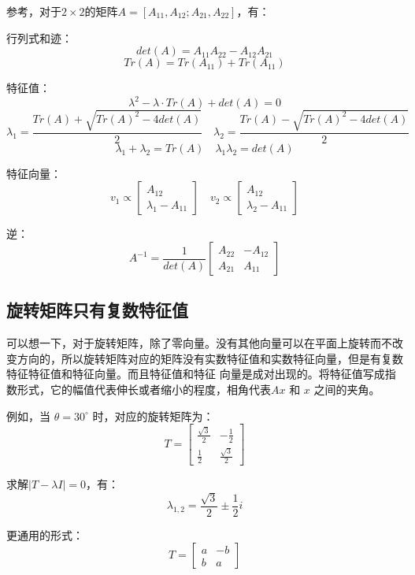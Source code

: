 \documentclass[12pt]{article}
\begin{document}
\begin{framed}  
\small{
参考\cite{The_Matrix_Cookbook}，对于$2\times 2$的矩阵$A = [A_{11}, A_{12};A_{21}, A_{22}]$，有：

行列式和迹：
$$
det(A) = A_{11}A_{22} - A_{12}A_{21}
$$
$$
Tr(A) = Tr(A_{11}) + Tr(A_{11}) 
$$

特征值：
$$
\lambda^2 - \lambda \cdot Tr(A) + det(A) = 0    
$$
$$
\lambda_1 = \frac{Tr(A)+\sqrt{Tr(A)^2 - 4det(A)}}{2} \quad
\lambda_2 = \frac{Tr(A)-\sqrt{Tr(A)^2 - 4det(A)}}{2}
$$
$$
\lambda_1 + \lambda_2 = Tr(A) \quad \lambda_1\lambda_2 = det(A)
$$

特征向量：
$$
v_1 \propto \begin{bmatrix}
A_{12} \\ \lambda_1 - A_{11}
\end{bmatrix}
\quad
v_2 \propto \begin{bmatrix}
A_{12} \\ \lambda_2 - A_{11}
\end{bmatrix}
$$

逆：
$$
A^{-1} = \frac{1}{det(A)}\begin{bmatrix}
A_{22} & -A_{12} \\
A_{21} & A_{11}
\end{bmatrix}
$$
}
\end{framed}

\subsection{旋转矩阵只有复数特征值}
可以想一下，对于旋转矩阵，除了零向量。没有其他向量可以在平面上旋转而不改变方向的，所以旋转矩阵对应的矩阵没有实数特征值和实数特征向量，但是有复数特征特征值和特征向量。而且特征值和特征 向量是成对出现的。将特征值写成指数形式，它的幅值代表伸长或者缩小的程度，相角代表$Ax$ 和 $x$ 之间的夹角。

例如，当 $\theta = 30^\circ$ 时，对应的旋转矩阵为：
$$
T = \begin{bmatrix}
\frac{\sqrt{3}}{2} & -\frac{1}{2} \\
\frac{1}{2} & \frac{\sqrt{3}}{2}
\end{bmatrix}
$$

求解$|T-\lambda I| = 0$，有：
$$
\lambda_{1,2} = \frac{\sqrt{3}}{2} \pm \frac{1}{2}i
$$

更通用的形式：
$$
T =  \begin{bmatrix}
a & -b \\ b & a
\end{bmatrix}
$$
\end{document}
